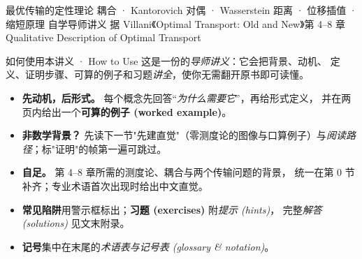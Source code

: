 



\TLtitlecenter
  {最优传输的定性理论}
  {耦合 · Kantorovich 对偶 · Wasserstein 距离 · 位移插值 · 缩短原理}
  {自学导师讲义 \textperiodcentered{} 据 Villani《Optimal Transport: Old and New》第 4--8 章}
  {Qualitative Description of Optimal Transport}

\begin{frame}{如何使用本讲义 · How to Use}
  这是一份的\emph{导师讲义}：它会把背景、动机、
  定义、证明步骤、可算的例子和习题\emph{讲全}，使你无需翻开原书即可读懂。
  \begin{itemize}
    \item \textbf{先动机，后形式。} 每个概念先回答“\emph{为什么需要它}”，再给形式定义，
          并在两页内给出一个\textbf{可算的例子 (worked example)}。
    \item \textbf{非数学背景？} 先读下一节"先建直觉"（零测度论的图像与口算例子）与\emph{阅读路径}；标"证明"的帧第一遍可跳过。
    \item \textbf{自足。} 第 4--8 章所需的测度论、耦合与两个传输问题的背景，
          统一在第 0 节补齐；专业术语首次出现时给出中文直觉。
    \item \textbf{常见陷阱}用警示框标出；\textbf{习题 (exercises)} 附\emph{提示 (hints)}，
          完整\emph{解答 (solutions)} 见文末附录。
    \item \textbf{记号}集中在末尾的\emph{术语表与记号表 (glossary \& notation)}。
  \end{itemize}
\end{frame}

